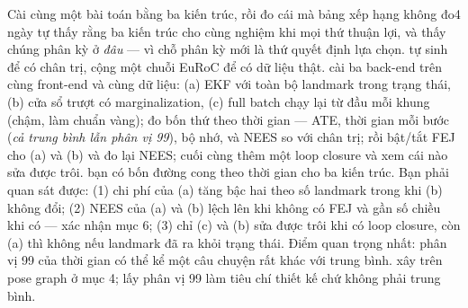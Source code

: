 \documentclass[../../vslam.tex]{subfiles}
\begin{document}
\begin{ungdung}
\end{ungdung}

\begin{duan}{Cài cùng một bài toán bằng ba kiến trúc, rồi đo cái mà bảng xếp hạng không đo}{4 ngày}
\dmt tự thấy rằng ba kiến trúc cho cùng nghiệm khi mọi thứ thuận lợi, và thấy chúng phân kỳ ở \emph{đâu} --- vì chỗ phân kỳ mới là thứ quyết định lựa chọn.
\ddl tự sinh để có chân trị, cộng một chuỗi EuRoC để có dữ liệu thật.
\dbc cài ba back-end trên cùng front-end và cùng dữ liệu: (a) EKF với toàn bộ landmark trong trạng thái, (b) cửa sổ trượt có marginalization, (c) full batch chạy lại từ đầu mỗi khung (chậm, làm chuẩn vàng); đo bốn thứ theo thời gian --- ATE, thời gian mỗi bước (\emph{cả trung bình lẫn phân vị 99}), bộ nhớ, và NEES so với chân trị; rồi bật/tắt FEJ cho (a) và (b) và đo lại NEES; cuối cùng thêm một loop closure và xem cái nào sửa được trôi.
\dxk bạn có bốn đường cong theo thời gian cho ba kiến trúc. Bạn phải quan sát được: (1) chi phí của (a) tăng bậc hai theo số landmark trong khi (b) không đổi; (2) NEES của (a) và (b) lệch lên khi không có FEJ và gần số chiều khi có --- xác nhận  mục 6; (3) chỉ (c) và (b) sửa được trôi khi có loop closure, còn (a) thì không nếu landmark đã ra khỏi trạng thái. Điểm quan trọng nhất: phân vị 99 của thời gian có thể kể một câu chuyện rất khác với trung bình.
\dnv {} xây trên pose graph ở mục 4;  lấy phân vị 99 làm tiêu chí thiết kế chứ không phải trung bình.
\end{duan}
\end{document}
